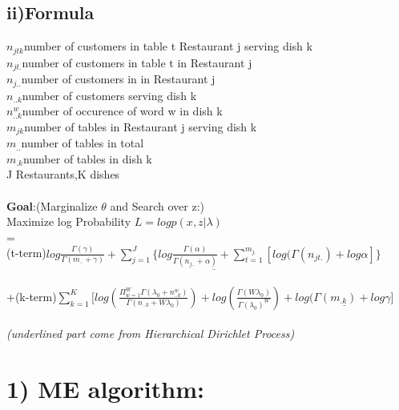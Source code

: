 \documentclass{article}
\begin{document}
\begin{spacing}{1.1}
\subsection{ii)Formula}
$n_{jtk}$number of customers in table t Restaurant j serving dish k \\
$n_{jt.}$number of customers in table t in Restaurant j \\
$n_{j..}$number of customers in in Restaurant j \\
$n_{..k}$number of customers serving dish k \\
$n_{..k}^{w}$number of occurence of word w in dish k \\
$m_{jk}$number of tables in Restaurant j serving dish k\\
$m_{..}$number of tables in total \\
$m_{.k}$number of tables in dish k \\
J Restaurants,K dishes\\ \\
{\bf Goal}:(Marginalize $\theta$ and Search over z:)\\
 Maximize log Probability $L=log p(x,z|\lambda)$\\ =\\
(t-term)$ \underline{log \frac{\Gamma(\gamma)}{\Gamma(m_{..}+\gamma)}+\sum_{j=1}^{J} \{log \frac{\Gamma(\alpha)}{\Gamma(n_{j..}+\alpha)}+\sum_{t=1}^{m_{j.}}[log(\Gamma(n_{jt.})+log \alpha
]\}}$\\ \\
+(k-term)$ \sum_{k=1}^{K} [log(\frac{\Pi_{w=1}^{W}\Gamma(\lambda_{0}+n_{..k}^{w})}{\Gamma(n_{..k}+W\lambda_{0})})+log(\frac{\Gamma(W\lambda_{0})}{\Gamma(\lambda_{0})^{W}})
+\underline{log(\Gamma(m_{.k})+log \gamma]}$\\ \\ \emph{{\small (underlined part come from Hierarchical Dirichlet Process)}}\\ 



\section{1) ME algorithm: }

\end{spacing}
\end{document}
